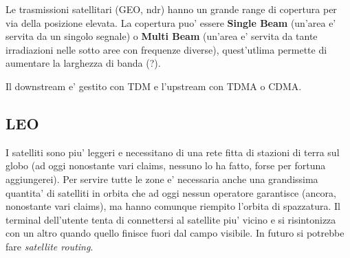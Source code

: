 Le trasmissioni satellitari (GEO, ndr) hanno un grande range di copertura per via della posizione elevata.
La copertura puo' essere \textbf{Single Beam} (un'area e' servita da un singolo segnale) o \textbf{Multi Beam} (un'area e' servita da tante irradiazioni nelle sotto aree con frequenze diverse), quest'utlima permette di aumentare la larghezza di banda (?).

Il downstream e' gestito con TDM e l'upstream con TDMA o CDMA.


\subsection{LEO}

I satelliti sono piu' leggeri e necessitano di una rete fitta di stazioni di terra sul globo (ad oggi nonostante vari claims, nessuno lo ha fatto, forse per fortuna aggiungerei).
Per servire tutte le zone e' necessaria anche una grandissima quantita' di satelliti in orbita che ad oggi nessun operatore garantisce (ancora, nonostante vari claims), ma hanno comunque riempito l'orbita di spazzatura.
Il terminal dell'utente tenta di connettersi al satellite piu' vicino e si risintonizza con un altro quando quello finisce fuori dal campo visibile.
In futuro si potrebbe fare \textit{satellite routing}.
